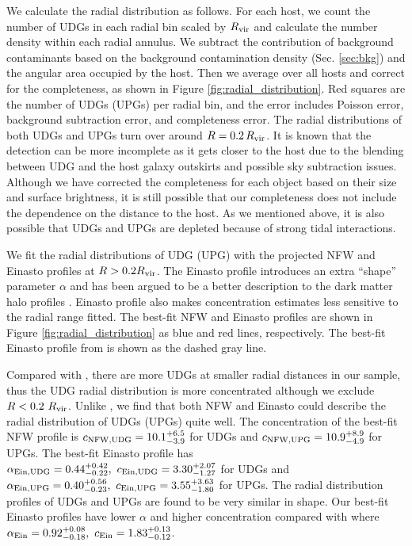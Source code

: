 \documentclass[twocolumn,astrosymb,twocolappendix]{aastex631}
\begin{document}
\begin{CJK*}{UTF8}{gbsn}
We calculate the radial distribution as follows. For each host, we count the number of UDGs in each radial bin scaled by $R_{\rm vir}$ and calculate the number density within each radial annulus. We subtract the contribution of background contaminants based on the background contamination density (Sec. \ref{sec:bkg}) and the angular area occupied by the host. Then we average over all hosts and correct for the completeness, as shown in Figure \ref{fig:radial_distribution}. Red squares are the number of UDGs (UPGs) per radial bin, and the error includes Poisson error, background subtraction error, and completeness error. The radial distributions of both UDGs and UPGs turn over around $R=0.2\,R_{\rm vir}$. It is known that the detection can be more incomplete as it gets closer to the host due to the blending between UDG and the host galaxy outskirts and possible sky subtraction issues. Although we have corrected the completeness for each object based on their size and surface brightness, it is still possible that our completeness does not include the dependence on the distance to the host. As we mentioned above, it is also possible that UDGs and UPGs are depleted because of strong tidal interactions. 

We fit the radial distributions of UDG (UPG) with the projected NFW and Einasto profiles at $R > 0.2 R_{\rm vir}$. The Einasto profile introduces an extra ``shape'' parameter $\alpha$ and has been argued to be a better description to the dark matter halo profiles \citep[e.g.,][]{Navarro2004,Gao2008,Navarro2010,Dutton2014}. Einasto profile also makes concentration estimates less sensitive to the radial range fitted. The best-fit NFW and Einasto profiles are shown in Figure \ref{fig:radial_distribution} as blue and red lines, respectively. The best-fit Einasto profile from \citet{vdBurg2016} is shown as the dashed gray line.

Compared with \citet{vdBurg2016}, there are more UDGs at smaller radial distances in our sample, thus the UDG radial distribution is more concentrated although we exclude $R < 0.2\ R_{\rm vir}$. Unlike \citet{vdBurg2016}, we find that both NFW and Einasto could describe the radial distribution of UDGs (UPGs) quite well. The concentration of the best-fit NFW profile is $c_{\rm NFW, UDG} = 10.1^{+6.5}_{-3.9}$ for UDGs and $c_{\rm NFW, UPG} = 10.9^{+8.9}_{-4.9}$ for UPGs. The best-fit Einasto profile has $\alpha_{\rm Ein, UDG} = 0.44^{+0.42}_{-0.22},\ c_{\rm Ein, UDG} = 3.30^{+2.07}_{-1.27}$ for UDGs and $\alpha_{\rm Ein, UPG} = 0.40^{+0.56}_{-0.23},\ c_{\rm Ein, UPG} = 3.55^{+3.63}_{-1.80}$ for UPGs. The radial distribution profiles of UDGs and UPGs are found to be very similar in shape. Our best-fit Einasto profiles have lower $\alpha$ and higher concentration compared with \citet{vdBurg2016} where $\alpha_{\rm Ein} = 0.92^{+0.08}_{-0.18},\ c_{\rm Ein} = 1.83^{+0.13}_{-0.12}$.


\end{CJK*}
\end{document}
